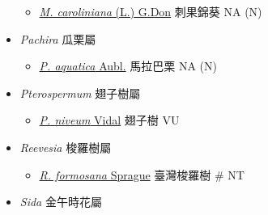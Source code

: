\begin{itemize}
  \begin{itemize}
        \item[] \href{http://www.theplantlist.org/tpl1.1/search?q=Modiola+caroliniana}{\textit{M. caroliniana} (L.) G.Don}   刺果錦葵   NA (N)
  \end{itemize}
 \item[] \textit{Pachira} 瓜栗屬
                                
  \begin{itemize}
        \item[] \href{http://www.theplantlist.org/tpl1.1/search?q=Pachira+aquatica}{\textit{P. aquatica} Aubl.}   馬拉巴栗   NA (N)
  \end{itemize}
 \item[] \textit{Pterospermum} 翅子樹屬
                                
  \begin{itemize}
        \item[] \href{http://www.theplantlist.org/tpl1.1/search?q=Pterospermum+niveum}{\textit{P. niveum} Vidal}   翅子樹   VU
  \end{itemize}
 \item[] \textit{Reevesia} 梭羅樹屬
                                
  \begin{itemize}
        \item[] \href{http://www.theplantlist.org/tpl1.1/search?q=Reevesia+formosana}{\textit{R. formosana} Sprague}   臺灣梭羅樹  \# NT
  \end{itemize}
 \item[] \textit{Sida} 金午時花屬
                                

\end{itemize}
